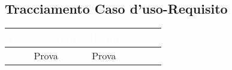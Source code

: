 \subsection{Tracciamento Caso d'uso-Requisito}
{
\renewcommand{\arraystretch}{1.5}
\centering
\begin{longtable}{ c C{4cm} c c}
\textcolor{white}{\textbf{Test di sistema}} & \textcolor{white}{\textbf{Requisito}}\\	
\endhead
Prova & Prova







\end{longtable}
}






















